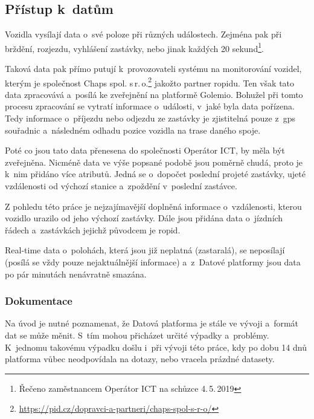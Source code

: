 \subsection{Přístup k~datům}

Vozidla vysílají data o~své poloze při různých událostech. Zejména pak při brždění, rozjezdu, vyhlášení zastávky, nebo jinak každých 20 sekund\footnote{Řečeno zaměstnancem Operátor ICT na schůzce 4.\,5.\,2019}.

\bigbreak

Taková data pak přímo putují k~provozovateli systému na monitorování vozidel, kterým je společnost Chaps spol. s\,r.\,o.\footnote{\url{https://pid.cz/dopravci-a-partneri/chaps-spol-s-r-o/}} jakožto partner \gls{ropid}u. Ten však tato data zpracovává a~posílá ke zveřejnění na platformě Golemio. Bohužel při tomto procesu zpracování se vytratí informace o~události, v~jaké byla data pořízena. Tedy informace o~příjezdu nebo odjezdu ze zastávky je zjistitelná pouze z~\gls{gps} souřadnic a~následném odhadu pozice vozidla na trase daného spoje.

\bigbreak

Poté co jsou tato data přenesena do společnosti Operátor ICT, by měla být zveřejněna. Nicméně data ve výše popsané podobě jsou poměrně chudá, proto je k~nim přidáno více atributů. Jedná se o~dopočet poslední projeté zastávky, ujeté vzdálenosti od výchozí stanice a~zpoždění v~poslední zastávce.

\bigbreak

Z pohledu této práce je nejzajímavější doplněná informace o~vzdálenosti, kterou vozidlo urazilo od jeho výchozí zastávky. Dále jsou přidána data o~jízdních řádech a~zastávkách jejichž původcem je \gls{ropid}.

\bigbreak

Real-time data o~polohách, která jsou již neplatná (zastaralá), se neposílají (posílá se vždy pouze nejaktuálnější informace) a~z~Datové platformy jsou data po pár minutách nenávratně smazána.

\subsubsection{Dokumentace}

Na úvod je nutné poznamenat, že Datová platforma je stále ve vývoji a~formát dat se může měnit. S~tím mohou přicházet určité výpadky a~problémy. K~jednomu takovému výpadku došlu i~při vývoji této práce, kdy po dobu 14 dnů platforma vůbec neodpovídala na dotazy, nebo vracela prázdné datasety.

